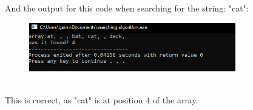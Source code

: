 \documentclass[12pt, a4paper]{article}
\begin{document}
And the output for this code when searching for the string: "cat":
\begin{figure}[ht!]
\centering
\includegraphics[width=90mm, angle=0]{codeOutput}
\end{figure} \\This is correct, as "cat" is at position 4 of the array.
\end{document}
